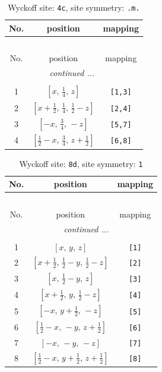 \documentclass[fleqn,8pt]{jsarticle}
\begin{document}
\renewcommand{\arraystretch}{1.2}
\begin{longtable}{ccc}
\caption{Wyckoff site: {\tt 4c}, site symmetry: {\tt .m.}}
 \\
 \hline \hline
No. & position & mapping \\ \hline \endfirsthead

\multicolumn{2}{l}{\tablename\ \thetable{}} \\
 \hline \hline
No. & position & mapping \\ \hline \endhead

 \hline \hline
\multicolumn{2}{r}{\footnotesize\it continued ...} \\ \endfoot

 \hline \hline
\multicolumn{2}{r}{} \\ \endlastfoot

1 & $\left[ x,\, \frac{1}{4},\, z \right]$ & {\tt [1,3]} \\ \hline
2 & $\left[ x + \frac{1}{2},\, \frac{1}{4},\, \frac{1}{2} - z \right]$ & {\tt [2,4]} \\ \hline
3 & $\left[ - x,\, \frac{3}{4},\, - z \right]$ & {\tt [5,7]} \\ \hline
4 & $\left[ \frac{1}{2} - x,\, \frac{3}{4},\, z + \frac{1}{2} \right]$ & {\tt [6,8]} \\
\end{longtable}
\renewcommand{\arraystretch}{1.2}
\begin{longtable}{ccc}
\caption{Wyckoff site: {\tt 8d}, site symmetry: {\tt 1}}
 \\
 \hline \hline
No. & position & mapping \\ \hline \endfirsthead

\multicolumn{2}{l}{\tablename\ \thetable{}} \\
 \hline \hline
No. & position & mapping \\ \hline \endhead

 \hline \hline
\multicolumn{2}{r}{\footnotesize\it continued ...} \\ \endfoot

 \hline \hline
\multicolumn{2}{r}{} \\ \endlastfoot

1 & $\left[ x,\, y,\, z \right]$ & {\tt [1]} \\ \hline
2 & $\left[ x + \frac{1}{2},\, \frac{1}{2} - y,\, \frac{1}{2} - z \right]$ & {\tt [2]} \\ \hline
3 & $\left[ x,\, \frac{1}{2} - y,\, z \right]$ & {\tt [3]} \\ \hline
4 & $\left[ x + \frac{1}{2},\, y,\, \frac{1}{2} - z \right]$ & {\tt [4]} \\ \hline
5 & $\left[ - x,\, y + \frac{1}{2},\, - z \right]$ & {\tt [5]} \\ \hline
6 & $\left[ \frac{1}{2} - x,\, - y,\, z + \frac{1}{2} \right]$ & {\tt [6]} \\ \hline
7 & $\left[ - x,\, - y,\, - z \right]$ & {\tt [7]} \\ \hline
8 & $\left[ \frac{1}{2} - x,\, y + \frac{1}{2},\, z + \frac{1}{2} \right]$ & {\tt [8]} \\
\end{longtable}
\end{document}
